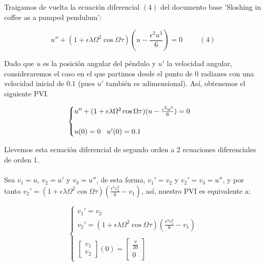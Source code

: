 \documentclass{article}
\begin{document}
Traigamos de vuelta la ecuación diferencial $(4)$ del documento base 'Sloshing in coffee as a pumped pendulum':

\[
u''+(1+\epsilon\lambda\Omega^{2}\cos{\Omega\tau})(u-\frac{\epsilon^2u^3}{6})=0 \hspace{1cm}(4)
\]

Dado que $u$ es la posición angular del péndulo y $u'$ la velocidad angular, consideraremos el caso en el que partimos desde el punto de 0 radianes con una velocidad inicial de 0.1 (pues $u'$ también es adimensional). Así, obtenemos el siguiente PVI.

\[
\begin{cases}
    u''+(1+\epsilon\lambda\Omega^{2}\cos{\Omega\tau})(u-\frac{\epsilon^2u^3}{6})=0\\ \\
    u(0)=0\hspace{0.3cm}u'(0)=0.1
\end{cases}
\]

Llevemos esta ecuación diferencial de segundo orden a 2 ecuaciones diferenciales de orden 1.\\
\\
Sea $v_1=u$, $v_2=u'$ y $v_3=u''$, de esta forma, $v_1'=v_2$ y $v_2'=v_3=u''$, y por tanto $v_2'=(1+\epsilon\lambda\Omega^{2}\cos{\Omega\tau})(\frac{\epsilon^2v_1^3}{6}-v_1)$, así, nuestro PVI es equivalente a:

\[
\begin{cases}
v_1'=v_2\\
v_2'=(1+\epsilon\lambda\Omega^{2}\cos{\Omega\tau})(\frac{\epsilon^2v_1^3}{6}-v_1)\\ \\
\begin{bmatrix}
    v_1\\
    v_2
\end{bmatrix}
(0)=
\begin{bmatrix}
    \frac{\pi}{30}\\
    0
\end{bmatrix}
\end{cases}
\]
\end{document}
